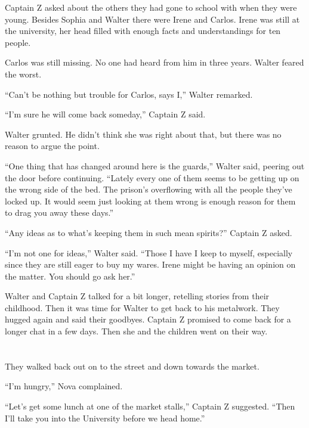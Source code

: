 \documentclass[12pt]{extbook}
\begin{document}
  Captain Z asked about the others they had gone to school with when they
  were young. Besides Sophia and Walter there were Irene and Carlos. Irene
  was still at the university, her head filled with enough facts and
  understandings for ten people.
  
  Carlos was still missing. No one had heard from him in three years.
  Walter feared the worst.
  
  \enquote{Can't be nothing but trouble for Carlos, says I,} Walter
  remarked.
  
  \enquote{I'm sure he will come back someday,} Captain Z said.
  
  Walter grunted. He didn't think she was right about that, but there was
  no reason to argue the point.
  
  \enquote{One thing that has changed around here is the guards,} Walter
  said, peering out the door before continuing. \enquote{Lately every one
  of them seems to be getting up on the wrong side of the bed. The
  prison's overflowing with all the people they've locked up. It would
  seem just looking at them wrong is enough reason for them to drag you
  away these days.}
  
  \enquote{Any ideas as to what's keeping them in such mean spirits?}
  Captain Z asked.
  
  \enquote{I'm not one for ideas,} Walter said. \enquote{Those I have I
  keep to myself, especially since they are still eager to buy my wares.
  Irene might be having an opinion on the matter. You should go ask her.}
  
  Walter and Captain Z talked for a bit longer, retelling stories from
  their childhood. Then it was time for Walter to get back to his
  metalwork. They hugged again and said their goodbyes. Captain Z promised
  to come back for a longer chat in a few days. Then she and the children
  went on their way.
  
  \section{}\label{section-30}
  
  They walked back out on to the street and down towards the market.
  
  \enquote{I'm hungry,} Nova complained.
  
  \enquote{Let's get some lunch at one of the market stalls,} Captain Z
  suggested. \enquote{Then I'll take you into the University before we
  head home.}
  
\end{document}
